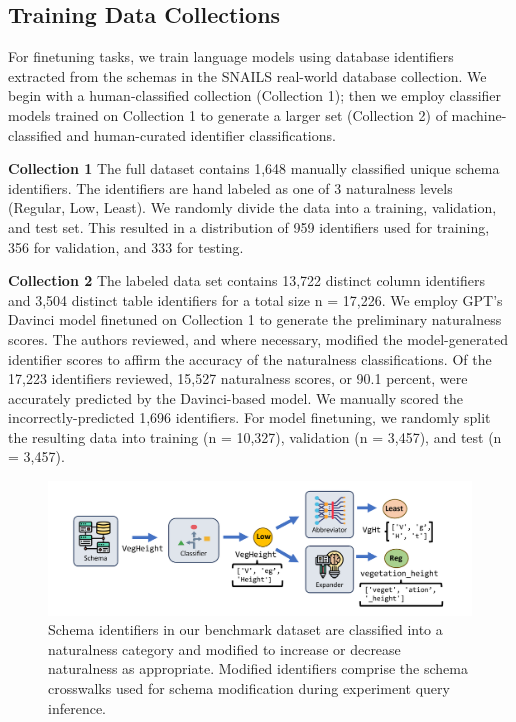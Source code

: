 \subsection{Training Data Collections}

For finetuning tasks, we train language models using database identifiers extracted from the schemas in the SNAILS real-world database collection.
We begin with a human-classified collection (Collection 1); then we employ classifier models trained on Collection 1 to generate a larger set (Collection 2) of machine-classified and human-curated identifier classifications.

\textbf{Collection 1} The full dataset contains 1,648 manually classified unique schema identifiers. The identifiers are hand labeled as one of 3 naturalness levels (Regular, Low, Least). We randomly divide the data into a training, validation, and test set. This resulted in a distribution of 959 identifiers used for training, 356 for validation, and 333 for testing. 

\textbf{Collection 2} The labeled data set contains 13,722 distinct column identifiers and 3,504 distinct table identifiers for a total size n = 17,226. 
We employ GPT's Davinci model finetuned on Collection 1 to generate the preliminary naturalness scores.
The authors reviewed, and where necessary, modified the model-generated identifier scores to affirm the accuracy of the naturalness classifications.
Of the 17,223 identifiers reviewed, 15,527 naturalness scores, or 90.1 percent, were accurately predicted by the Davinci-based model.
We manually scored the incorrectly-predicted 1,696 identifiers.
For model finetuning, we randomly split the resulting data into training (n = 10,327), validation (n = 3,457), and test (n = 3,457).

\begin{figure}
  \centering
  \includegraphics[width=\linewidth]{figures/classify-modify-pipeline.pdf}
  \caption{Schema identifiers in our benchmark dataset are classified into a naturalness category and modified to increase or decrease naturalness as appropriate. Modified identifiers comprise the schema crosswalks used for schema modification during experiment query inference.}
  \label{fig:classify-modify-pipeline}
\end{figure}

